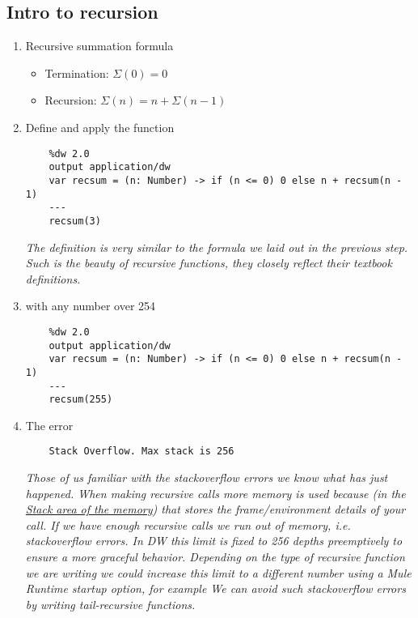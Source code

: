 \subsection{Intro to recursion}
\begin{enumerate}[resume*]
\item Recursive summation formula
  \begin{itemize}
  \item Termination: $\Sigma(0) = 0$
  \item Recursion: $\Sigma(n) = n + \Sigma(n - 1)$
  \end{itemize}
\item Define and apply the  function
  \begin{lstlisting}
    %dw 2.0
    output application/dw
    var recsum = (n: Number) -> if (n <= 0) 0 else n + recsum(n - 1)
    ---
    recsum(3)
  \end{lstlisting}
  \emph{
    The definition is very similar to the formula we laid out in the previous step.  Such is the beauty of recursive functions, they closely reflect their textbook definitions.
    \newline
  }
\item {} with any number over 254
  \begin{lstlisting}
    %dw 2.0
    output application/dw
    var recsum = (n: Number) -> if (n <= 0) 0 else n + recsum(n - 1)
    ---
    recsum(255)
  \end{lstlisting}
\item The  error
  \begin{lstlisting}
    Stack Overflow. Max stack is 256
  \end{lstlisting}
  \emph{
    Those of us familiar with the stackoverflow errors we know what has just happened.  When making recursive calls more memory is used because (in the \href{https://en.wikipedia.org/wiki/Stack-based_memory_allocation}{Stack area of the memory}) that stores the frame/environment details of your call.  If we have enough recursive calls we run out of memory, i.e. stackoverflow errors.
    \newline
    In DW this limit is fixed to 256 depths preemptively to ensure a more graceful behavior.  Depending on the type of recursive function we are writing we could increase this limit to a different number using a Mule Runtime startup option, for example 
    \newline We can avoid such stackoverflow errors by writing tail-recursive functions.
  }


\end{enumerate}
